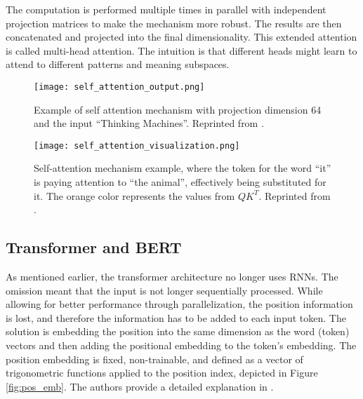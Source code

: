 The computation is performed multiple times in parallel with independent projection matrices to make the mechanism more robust.
The results are then concatenated and projected into the final dimensionality.
This extended attention is called multi-head attention.
The intuition is that different heads might learn to attend to different patterns and meaning subspaces.

\begin{figure}[!htb]
	\centering
	\begin{minipage}{.49\textwidth}
		\centering
		\texttt{[image: self\_attention\_output.png]}
                \caption[Attention Mechanism Computation Example]{Example of self attention mechanism with projection dimension 64 and the input ``Thinking Machines''. Reprinted from \citep{illustrated-transformer}.}
	\end{minipage}
        \hfill
	\begin{minipage}{.49\textwidth}
		\centering
		\texttt{[image: self\_attention\_visualization.png]}
                \caption[Attention Values Visualization]{Self-attention mechanism example, where the token for the word ``it'' is paying attention to ``the animal'', effectively being substituted for it. The orange color represents the values from $QK^T$. Reprinted from \citep{illustrated-transformer}.}
                \label{fig:self-attn}
	\end{minipage}
\end{figure}

\subsection{Transformer and BERT}

As mentioned earlier, the transformer architecture no longer uses RNNs.
The omission meant that the input is not longer sequentially processed.
While allowing for better performance through parallelization, the position information is lost, and therefore the information has to be added to each input token.
The solution is embedding the position into the same dimension as the word (token) vectors and then adding the positional embedding to the token's embedding.
The position embedding is fixed, non-trainable, and defined as a vector of trigonometric functions applied to the position index, depicted in Figure \ref{fig:pos_emb}.
The authors provide a detailed explanation in \citep[Section 3.5]{attention-is-all-you-need}.

